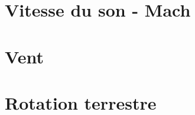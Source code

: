     \chapter{Vitesse du son - Mach}
    \label{chap:son_mach}
    

    \chapter{Vent}
    \label{chap:vent}
    

    \chapter{Rotation terrestre}
    \label{chap:rotation_terrestre}
    

